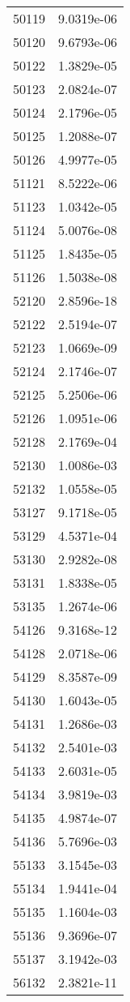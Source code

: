 \begin{table}[h!]
\begin{tabular}{|| c || c |}
50119 & 9.0319e-06 \\
50120 & 9.6793e-06 \\
50122 & 1.3829e-05 \\
50123 & 2.0824e-07 \\
50124 & 2.1796e-05 \\
50125 & 1.2088e-07 \\
50126 & 4.9977e-05 \\
51121 & 8.5222e-06 \\
51123 & 1.0342e-05 \\
51124 & 5.0076e-08 \\
51125 & 1.8435e-05 \\
51126 & 1.5038e-08 \\
52120 & 2.8596e-18 \\
52122 & 2.5194e-07 \\
52123 & 1.0669e-09 \\
52124 & 2.1746e-07 \\
52125 & 5.2506e-06 \\
52126 & 1.0951e-06 \\
52128 & 2.1769e-04 \\
52130 & 1.0086e-03 \\
52132 & 1.0558e-05 \\
53127 & 9.1718e-05 \\
53129 & 4.5371e-04 \\
53130 & 2.9282e-08 \\
53131 & 1.8338e-05 \\
53135 & 1.2674e-06 \\
54126 & 9.3168e-12 \\
54128 & 2.0718e-06 \\
54129 & 8.3587e-09 \\
54130 & 1.6043e-05 \\
54131 & 1.2686e-03 \\
54132 & 2.5401e-03 \\
54133 & 2.6031e-05 \\
54134 & 3.9819e-03 \\
54135 & 4.9874e-07 \\
54136 & 5.7696e-03 \\
55133 & 3.1545e-03 \\
55134 & 1.9441e-04 \\
55135 & 1.1604e-03 \\
55136 & 9.3696e-07 \\
55137 & 3.1942e-03 \\
56132 & 2.3821e-11 \\

\end{tabular}
\end{table}
